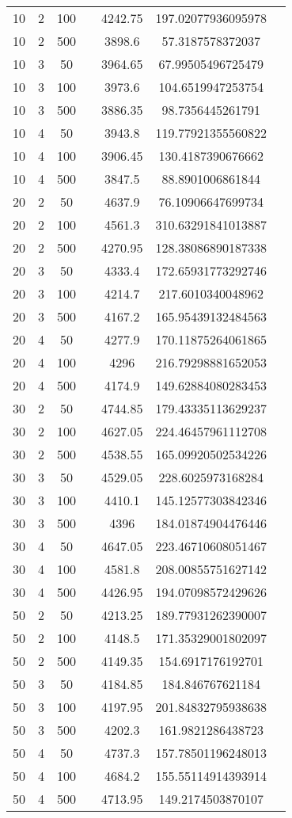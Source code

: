 {\begin{longtabu}{S
S
S
S
S
S[round-mode=places,round-precision=0]
S[round-mode=places,round-precision=0]}
10 & 2 & 100 & & 4242.75 & 197.02077936095978 \\
10 & 2 & 500 & & 3898.6 & 57.3187578372037 \\
10 & 3 & 50 & & 3964.65 & 67.99505496725479 \\
10 & 3 & 100 & & 3973.6 & 104.6519947253754 \\
10 & 3 & 500 & & 3886.35 & 98.7356445261791 \\
10 & 4 & 50 & & 3943.8 & 119.77921355560822 \\
10 & 4 & 100 & & 3906.45 & 130.4187390676662 \\
10 & 4 & 500 & & 3847.5 & 88.8901006861844 \\
20 & 2 & 50 & & 4637.9 & 76.10906647699734 \\
20 & 2 & 100 & & 4561.3 & 310.63291841013887 \\
20 & 2 & 500 & & 4270.95 & 128.38086890187338 \\
20 & 3 & 50 & & 4333.4 & 172.65931773292746 \\
20 & 3 & 100 & & 4214.7 & 217.6010340048962 \\
20 & 3 & 500 & & 4167.2 & 165.95439132484563 \\
20 & 4 & 50 & & 4277.9 & 170.11875264061865 \\
20 & 4 & 100 & & 4296 & 216.79298881652053 \\
20 & 4 & 500 & & 4174.9 & 149.62884080283453 \\
30 & 2 & 50 & & 4744.85 & 179.43335113629237 \\
30 & 2 & 100 & & 4627.05 & 224.46457961112708 \\
30 & 2 & 500 & & 4538.55 & 165.09920502534226 \\
30 & 3 & 50 & & 4529.05 & 228.6025973168284 \\
30 & 3 & 100 & & 4410.1 & 145.12577303842346 \\
30 & 3 & 500 & & 4396 & 184.01874904476446 \\
30 & 4 & 50 & & 4647.05 & 223.46710608051467 \\
30 & 4 & 100 & & 4581.8 & 208.00855751627142 \\
30 & 4 & 500 & & 4426.95 & 194.07098572429626 \\
50 & 2 & 50 & & 4213.25 & 189.77931262390007 \\
50 & 2 & 100 & & 4148.5 & 171.35329001802097 \\
50 & 2 & 500 & & 4149.35 & 154.6917176192701 \\
50 & 3 & 50 & & 4184.85 & 184.846767621184 \\
50 & 3 & 100 & & 4197.95 & 201.84832795938638 \\
50 & 3 & 500 & & 4202.3 & 161.9821286438723 \\
50 & 4 & 50 & & 4737.3 & 157.78501196248013 \\
50 & 4 & 100 & & 4684.2 & 155.55114914393914 \\
50 & 4 & 500 & & 4713.95 & 149.2174503870107 \\
\hline
\end{longtabu}

}
